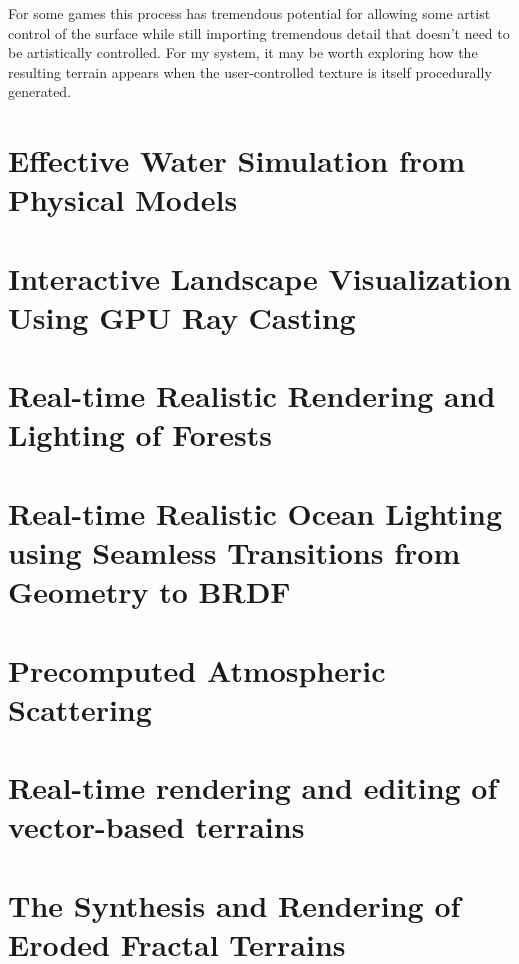 For some games this process has tremendous potential for allowing some artist control of the surface while still importing tremendous detail that doesn't need to be artistically controlled.
For my system, it may be worth exploring how the resulting terrain appears when the user-controlled texture is itself procedurally generated.


\section{Effective Water Simulation from Physical Models}


\section{Interactive Landscape Visualization Using GPU Ray Casting}


\section{Real-time Realistic Rendering and Lighting of Forests}


\section{Real-time Realistic Ocean Lighting using Seamless Transitions from Geometry to BRDF}


\section{Precomputed Atmospheric Scattering}


\section{Real-time rendering and editing of vector-based terrains}


\section{The Synthesis and Rendering of Eroded Fractal Terrains}


